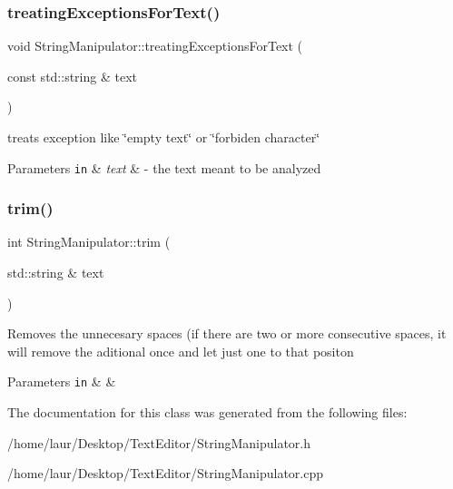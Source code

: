 \subsubsection{\texorpdfstring{treating\+Exceptions\+For\+Text()}{treatingExceptionsForText()}}
{\footnotesize\ttfamily void String\+Manipulator\+::treating\+Exceptions\+For\+Text (\begin{DoxyParamCaption}\item[{const std\+::string \&}]{text }\end{DoxyParamCaption})\hspace{0.3cm}{\ttfamily [static]}}

treats exception like \char`\"{}empty text\char`\"{} or \char`\"{}forbiden character\char`\"{}


\begin{DoxyParams}[1]{Parameters}
\mbox{\tt in}  & {\em text} & -\/ the text meant to be analyzed \\
\hline
\end{DoxyParams}
\mbox{\label{class_string_manipulator_a37e0bceb7f3f726912f3750e2910c30d}} 
\subsubsection{\texorpdfstring{trim()}{trim()}}
{\footnotesize\ttfamily int String\+Manipulator\+::trim (\begin{DoxyParamCaption}\item[{std\+::string \&}]{text }\end{DoxyParamCaption})\hspace{0.3cm}{\ttfamily [static]}}

Removes the unnecesary spaces (if there are two or more consecutive spaces, it will remove the aditional once and let just one to that positon


\begin{DoxyParams}[1]{Parameters}
\mbox{\tt in}  & {\em } & \\
\hline
\end{DoxyParams}


The documentation for this class was generated from the following files\+:\begin{DoxyCompactItemize}
\item 
/home/laur/\+Desktop/\+Text\+Editor/String\+Manipulator.\+h\item 
/home/laur/\+Desktop/\+Text\+Editor/String\+Manipulator.\+cpp\end{DoxyCompactItemize}
